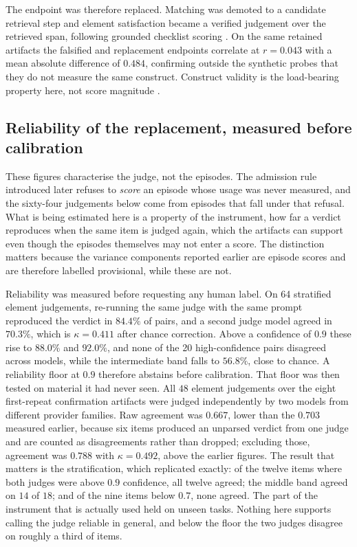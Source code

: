 \documentclass[11pt,a4paper]{article}
\begin{document}
The endpoint was therefore replaced.  Matching was demoted to a candidate
retrieval step and element satisfaction became a verified judgement over the
retrieved span, following grounded checklist scoring \citep{checklistcredit2026}.
On the same retained artifacts the falsified and replacement endpoints correlate
at $r = 0.043$ with a mean absolute difference of $0.484$, confirming outside the
synthetic probes that they do not measure the same construct.  Construct validity
is the load-bearing property here, not score magnitude \citep{constructvalidity2026}.

\subsection{Reliability of the replacement, measured before calibration}

These figures characterise the judge, not the episodes. The admission rule introduced
later refuses to \emph{score} an episode whose usage was never measured, and the
sixty-four judgements below come from episodes that fall under that refusal. What is
being estimated here is a property of the instrument, how far a verdict reproduces when
the same item is judged again, which the artifacts can support even though the episodes
themselves may not enter a score. The distinction matters because the variance components
reported earlier are episode scores and are therefore labelled provisional, while these
are not.

Reliability was measured before requesting any human label.  On 64 stratified
element judgements, re-running the same judge with the same prompt reproduced
the verdict in $84.4\%$ of pairs, and a second judge model agreed in $70.3\%$,
which is $\kappa = 0.411$ after chance correction.  Above a confidence of $0.9$
these rise to $88.0\%$ and $92.0\%$, and none of the 20 high-confidence pairs
disagreed across models, while the intermediate band falls to $56.8\%$, close to
chance.  A reliability floor at $0.9$ therefore abstains before calibration. That floor was then tested on
material it had never seen. All $48$ element judgements over the eight first-repeat
confirmation artifacts were judged independently by two models from different provider
families. Raw agreement was $0.667$, lower than the $0.703$ measured earlier, because six
items produced an unparsed verdict from one judge and are counted as disagreements rather
than dropped; excluding those, agreement was $0.788$ with $\kappa = 0.492$, above the
earlier figures. The result that matters is the stratification, which replicated exactly:
of the twelve items where both judges were above $0.9$ confidence, all twelve agreed; the
middle band agreed on $14$ of $18$; and of the nine items below $0.7$, none agreed. The
part of the instrument that is actually used held on unseen tasks. Nothing here supports
calling the judge reliable in general, and below the floor the two judges disagree on
roughly a third of items.
\end{document}
